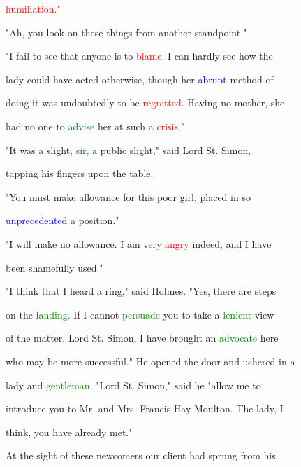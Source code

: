  \textcolor{red}{humiliation."}



 "Ah, you look on these things from another standpoint."



 "I fail to see that anyone is to \textcolor{red}{blame.} I can hardly see how the

 lady could have acted otherwise, though her \textcolor{blue}{abrupt} method of

 doing it was undoubtedly to be \textcolor{red}{regretted.} Having no \textcolor{BurntOrange}{mother,} she

 had no one to \textcolor{green}{advise} her at such a \textcolor{red}{crisis."}



 "It was a slight, \textcolor{green}{sir,} a \textcolor{BurntOrange}{public} slight," said \textcolor{BurntOrange}{Lord} St. Simon,

 tapping his fingers upon the table.



 "You must make allowance for this poor girl, placed in so

 \textcolor{blue}{unprecedented} a position."



 "I will make no allowance. I am very \textcolor{red}{angry} indeed, and I have

 been shamefully used."



 "I think that I heard a ring," said Holmes. "Yes, there are steps

 on the \textcolor{green}{landing.} If I cannot \textcolor{green}{persuade} you to take a \textcolor{green}{lenient} view

 of the matter, \textcolor{BurntOrange}{Lord} St. Simon, I have brought an \textcolor{green}{advocate} here

 who may be more \textcolor{BurntOrange}{successful."} He opened the door and ushered in a

 lady and \textcolor{green}{gentleman.} \textcolor{BurntOrange}{"Lord} St. Simon," said he "allow me to

 introduce you to Mr. and Mrs. Francis Hay Moulton. The lady, I

 think, you have already met."



 At the sight of these \textcolor{BurntOrange}{newcomers} our client had sprung from his


